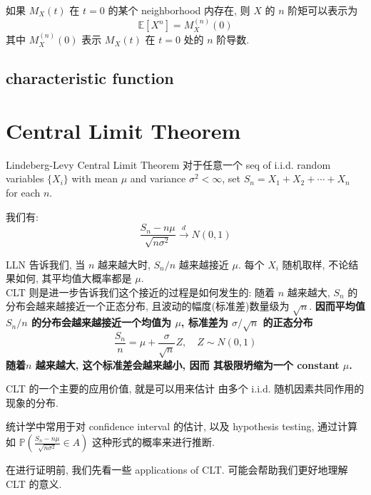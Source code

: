 \begin{proposition}{}
如果 $M_X(t)$ 在 $t=0$ 的某个 neighborhood 内存在, 
则 $X$ 的 $n$ 阶矩可以表示为
    $$
    \mathbb{E}[X^n] = M_X^{(n)}(0)
    $$
其中 $M_X^{(n)}(0)$ 表示 $M_X(t)$ 在 $t=0$ 处的 $n$ 阶导数.
\end{proposition}


\subsection{characteristic function}




\section{Central Limit Theorem}
\begin{theorem}{Lindeberg-Levy Central Limit Theorem}
对于任意一个 seq of i.i.d. random variables $\{X_i\}$
 with mean $\mu$ and variance $\sigma^2 < \infty$, 
 set $S_n = X_1 + X_2 + \cdots + X_n$ for each $n$. 

我们有:
$$ 
\frac{S_n - n\mu}{\sqrt{n\sigma^2}} \overset{d}{\longrightarrow} N(0,1)
$$
\end{theorem}
\begin{remark}
LLN 告诉我们, 当 $n$ 越来越大时, $S_n/n$ 越来越接近 $\mu$. 
每个 $X_i$ 随机取样, 不论结果如何, 其平均值大概率都是 $\mu$.\\

CLT 则是进一步告诉我们这个接近的过程是如何发生的:
随着 $n$ 越来越大, $S_n$ 的分布会越来越接近一个正态分布,
且波动的幅度(标准差)数量级为 $\sqrt{n}$. 
\textbf{因而平均值 $S_n / n$ 的分布会越来越接近一个均值为 $\mu$,
 标准差为 $\sigma / \sqrt{n}$ 的正态分布}
 $$
 \frac{S_n}{n} = \mu + \frac{\sigma}{\sqrt{n}}Z, \quad Z \sim N(0,1)
$$ 
\textbf{ 随着$n$ 越来越大, 这个标准差会越来越小, 因而
其极限坍缩为一个 constant $\mu$.}\\
\end{remark}
\begin{remark}
CLT 的一个主要的应用价值, 就是可以用来估计
由多个 i.i.d. 随机因素共同作用的现象的分布. 

统计学中常用于对 confidence interval 的估计, 
以及 hypothesis testing,
通过计算如 $\mathbb{P}\left(\frac{S_n-n \mu}{\sqrt{n \sigma^2}} \in A\right)$
这种形式的概率来进行推断. \\
\end{remark}

在进行证明前, 我们先看一些 applications of CLT.
可能会帮助我们更好地理解 CLT 的意义.



